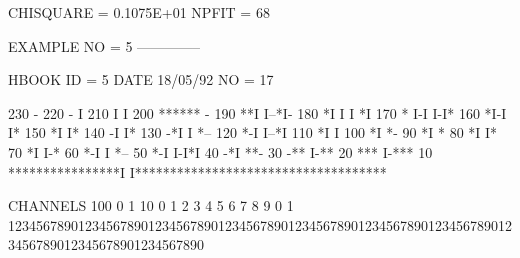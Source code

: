 \begin{Listing}
{ CHISQUARE = 0.1075E+01  NPFIT =   68
}



 EXAMPLE NO = 5                                                                  
 --------------                                                                  
 
                                                                                 
 
 HBOOK     ID =         5                                        DATE  18/05/92              NO =    17
 
      230                                               -
      220                                            -  I
      210                                            I  I
      200                                            ****** -
      190                                          **I  I--*I-
      180                                         *I I    I *I
      170                                        * I-I    I-I*
      160                                       *I-I         I*
      150                                      *I             I*
      140                                      -I              I*
      130                                    -*I               I *--
      120                                    *-I               I--*I
      110                                   *I                     I
      100                                  *I                      *-
       90                                 *I                        *
       80                                *I                         I*
       70                               *I                          I-*
       60                              *-I                           I *--
       50                             *-I                            I-I*I
       40                           -*I                                  **-
       30                         -**                                    I-**
       20                       ***                                        I-***
       10       ****************I                                              I************************************
 
 CHANNELS 100   0                                                                                                  1   
           10   0        1         2         3         4         5         6         7         8         9         0   
            1   1234567890123456789012345678901234567890123456789012345678901234567890123456789012345678901234567890   
 

\end{Listing}
